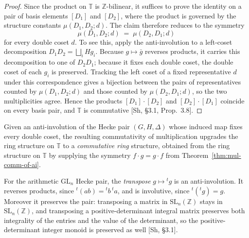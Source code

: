 \begin{proof}\leanok
{}
Since the product on $\mathbb{T}$ is $\mathbb{Z}$-bilinear, it suffices to prove the identity on
a pair of basis elements $[D_1]$ and $[D_2]$, where the product is governed by the structure
constants $\mu(D_1,D_2;d)$. The claim therefore reduces to the symmetry
\[
  \mu(D_1,D_2;d)\;=\;\mu(D_2,D_1;d)
\]
for every double coset $d$. To see this, apply the anti-involution to a left-coset
decomposition $D_1D_2=\bigsqcup_i Hg_i$. Because $g\mapsto\bar g$ reverses products, it carries
this decomposition to one of $D_2D_1$; because it fixes each double coset, the double coset of
each $g_i$ is preserved. Tracking the left coset of a fixed representative $d$ under this
correspondence gives a bijection between the pairs of representatives counted by
$\mu(D_1,D_2;d)$ and those counted by $\mu(D_2,D_1;d)$, so the two multiplicities agree. Hence
the products $[D_1]\cdot[D_2]$ and $[D_2]\cdot[D_1]$ coincide on every basis pair, and
$\mathbb{T}$ is commutative [Sh, \S3.1, Prop.~3.8].
\end{proof}

\begin{definition}\label{def:commring-of-ai}
\leanok
{}
Given an anti-involution of the Hecke pair $(G,H,\Delta)$ whose induced map fixes every double
coset, the resulting commutativity of multiplication upgrades the ring structure on $\mathbb{T}$
to a \emph{commutative ring} structure, obtained from the ring structure on $\mathbb{T}$ by
supplying the symmetry $f\cdot g=g\cdot f$ from Theorem~\ref{thm:mul-comm-of-ai}.
\end{definition}

\begin{definition}\label{def:gl-pair-ai}
\leanok
{}
For the arithmetic $\mathrm{GL}_n$ Hecke pair, the \emph{transpose} $g\mapsto{}^{t}g$ is an
anti-involution. It reverses products, since ${}^{t}(ab)={}^{t}b\,{}^{t}a$, and is involutive,
since ${}^{t}({}^{t}g)=g$. Moreover it preserves the pair: transposing a matrix in
$\mathrm{SL}_n(\mathbb{Z})$ stays in $\mathrm{SL}_n(\mathbb{Z})$, and transposing a
positive-determinant integral matrix preserves both integrality of the entries and the value of
the determinant, so the positive-determinant integer monoid is preserved as well [Sh, \S3.1].
\end{definition}

